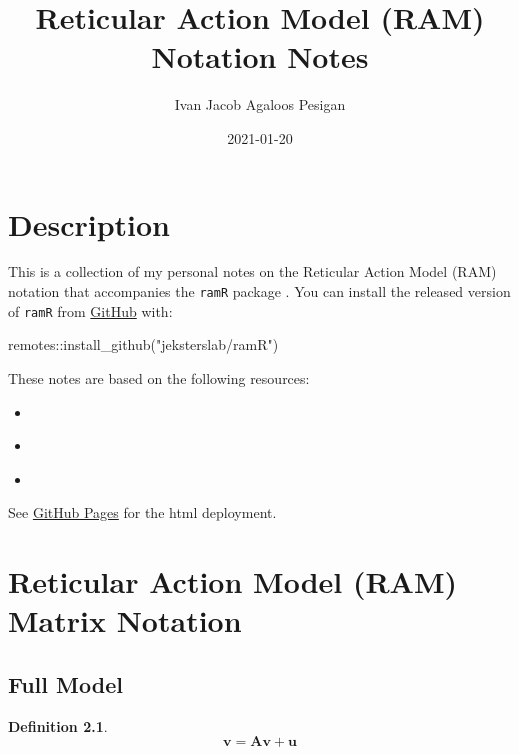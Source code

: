 \documentclass[
]{book}
\title{Reticular Action Model (RAM) Notation Notes}
\author{Ivan Jacob Agaloos Pesigan}
\date{2021-01-20}
\newenvironment{Shaded}{\begin{snugshade}}{\end{snugshade}}
\newcommand{\FunctionTok}[1]{\textcolor[rgb]{0.00,0.00,0.00}{#1}}
\newcommand{\NormalTok}[1]{#1}
\newcommand{\SpecialCharTok}[1]{\textcolor[rgb]{0.00,0.00,0.00}{#1}}
\newcommand{\StringTok}[1]{\textcolor[rgb]{0.31,0.60,0.02}{#1}}
\providecommand{\tightlist}{%
  \setlength{\itemsep}{0pt}\setlength{\parskip}{0pt}}
\theoremstyle{definition}
\newtheorem{definition}{Definition}[chapter]
\theoremstyle{definition}
\theoremstyle{definition}
\theoremstyle{remark}
\begin{document}
\maketitle

{
\setcounter{tocdepth}{1}
\tableofcontents
}
\hypertarget{description}{%
\chapter{Description}\label{description}}

This is a collection of my personal notes on the Reticular Action Model (RAM) notation
that accompanies the \texttt{ramR} package \citep{R-ramR}.
You can install the released version of \texttt{ramR} from \href{https://github.com/jeksterslab/ramR}{GitHub} with:

\begin{Shaded}
\begin{Highlighting}[]
\NormalTok{remotes}\SpecialCharTok{::}\FunctionTok{install\_github}\NormalTok{(}\StringTok{"jeksterslab/ramR"}\NormalTok{)}
\end{Highlighting}
\end{Shaded}

These notes are based on the following resources:

\begin{itemize}
\tightlist
\item
  \citet{Boker-2005}
\item
  \citet{McArdle-1984}
\item
  \citet{McArdle-2005}
\end{itemize}

See \href{https://jeksterslab.github.io/ramR_notes/index.html}{GitHub Pages}
for the html deployment.

\hypertarget{ram-matrix-notation}{%
\chapter{Reticular Action Model (RAM) Matrix Notation}\label{ram-matrix-notation}}

\hypertarget{full-model}{%
\section{Full Model}\label{full-model}}

\begin{definition}
\protect\hypertarget{def:unnamed-chunk-2}{}{\label{def:unnamed-chunk-2} }\begin{equation}
  \mathbf{v}
  =
  \mathbf{A} \mathbf{v} + \mathbf{u}
\end{equation}
\end{definition}
\end{document}
